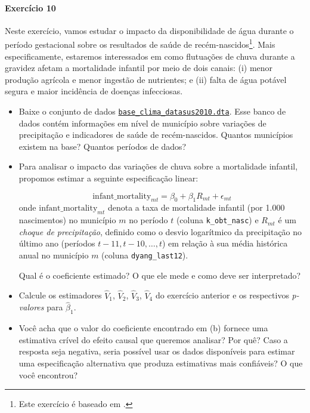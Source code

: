 \documentclass[10pt,a4paper]{article}
\begin{document}
 \paragraph{Exercício 10} Neste exercício, vamos estudar o impacto da disponibilidade de água durante o período gestacional sobre os resultados de saúde de recém-nascidos\footnote{Este exercício é baseado em .}. Mais especificamente, estaremos interessados em como flutuações de chuva durante a gravidez afetam a mortalidade infantil por meio de dois canais: (i) menor produção agrícola e menor ingestão de nutrientes; e (ii) falta de água potável segura e maior incidência de doenças infecciosas.
 
 \begin{itemize}
 	
 	\item[a] Baixe o conjunto de dados 
 	\texttt{\href{https://ars.els-cdn.com/content/image/1-s2.0-S0304387814001096-mmc1.zip}{base\_clima\_datasus2010.dta}}. 
 	Esse banco de dados contém informações em nível de município sobre variações de precipitação e indicadores de saúde de recém-nascidos. Quantos municípios existem na base? Quantos períodos de dados?
 	
 	\item[b] Para analisar o impacto das variações de chuva sobre a mortalidade infantil, propomos estimar a seguinte especificação linear:
 	
 	\begin{equation}
 		\text{infant\_mortality}_{mt} =  \beta_0 + \beta_1 R_{mt} + \epsilon_{mt}
 	\end{equation}
 	onde $\text{infant\_mortality}_{mt}$ denota a taxa de mortalidade infantil (por 1.000 nascimentos) no município $m$ no período $t$ (coluna \texttt{k\_obt\_nasc}) e $R_{mt}$ é um \emph{choque de precipitação}, definido como o desvio logarítmico da precipitação no último ano (períodos $t-11, t-10, \ldots, t$) em relação à sua média histórica anual no município $m$ (coluna \texttt{dyang\_last12}). 
 	
 	Qual é o coeficiente estimado? O que ele mede e como deve ser interpretado?
 	
 	\item[c] Calcule os estimadores $\hat{V}_1$, $\hat{V}_2$, $\hat{V}_3$, $\hat{V}_4$ do exercício anterior e os respectivos \emph{p-valores} para $\hat{\beta}_1$.
 	
 	\item[d] Você acha que o valor do coeficiente encontrado em (b) fornece uma estimativa crível do efeito causal que queremos analisar? Por quê? Caso a resposta seja negativa, seria possível usar os dados disponíveis para estimar uma especificação alternativa que produza estimativas mais confiáveis? O que você encontrou?
 	
 \end{itemize}
 
\end{document}
